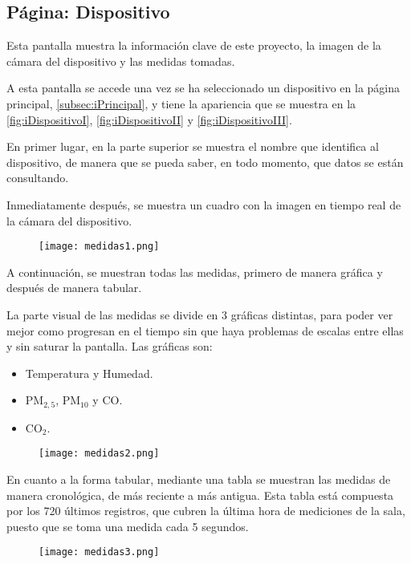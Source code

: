 \subsection{Página: Dispositivo}\label{subsec:iDispositivo}
Esta pantalla muestra la información clave de este proyecto, la imagen de la cámara del dispositivo y las medidas tomadas. 

A esta pantalla se accede una vez se ha seleccionado un dispositivo en la página principal, \autoref{subsec:iPrincipal}, y tiene la apariencia que se muestra en la \autoref{fig:iDispositivoI}, \autoref{fig:iDispositivoII} y \autoref{fig:iDispositivoIII}.

En primer lugar, en la parte superior se muestra el nombre que identifica al dispositivo, de manera que se pueda saber, en todo momento, que datos se están consultando.

Inmediatamente después, se muestra un cuadro con la imagen en tiempo real de la cámara del dispositivo.
\begin{figure}[H]
	{\texttt{[image: medidas1.png]}}
\end{figure}
A continuación, se muestran todas las medidas, primero de manera gráfica y después de manera tabular.

La parte visual de las medidas se divide en 3 gráficas distintas, para poder ver mejor como progresan en el tiempo sin que haya problemas de escalas entre ellas y sin saturar la pantalla. Las gráficas son:
\begin{itemize}
	\item Temperatura y Humedad.
	\item PM$_{2,5}$, PM$_{10}$ y CO\@.
	\item CO$_2$.
\end{itemize}
\begin{figure}[H]
	{\texttt{[image: medidas2.png]}}
\end{figure}
En cuanto a la forma tabular, mediante una tabla se muestran las medidas de manera cronológica, de más reciente a más antigua. Esta tabla está compuesta por los 720 últimos registros, que cubren la última hora de mediciones de la sala, puesto que se toma una medida cada 5 segundos.
\vspace{.5cm}
\begin{figure}[H]
	{\texttt{[image: medidas3.png]}}
\end{figure}


